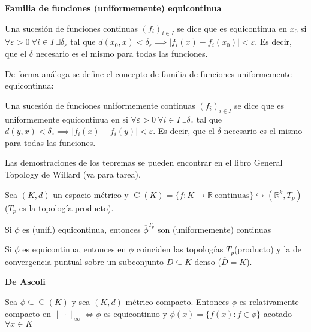 \documentclass[openany]{book}
\begin{document}
\begin{definition}
    \textbf{Familia de funciones (uniformemente) equicontinua}

    Una sucesión de funciones continuas $ (f_{i})_{i \in I} $ se dice que es equicontinua en $ x_0 $ si $ \forall  \varepsilon > 0\ \forall i \in I\  \exists \delta_{\varepsilon}$ tal que $ d(x_0,x) < \delta_{\varepsilon} \implies |f_{i}(x)-f_{i}(x_0)| < \varepsilon $. Es decir, que el $ \delta  $ necesario es el mismo para todas las funciones.
    
    De forma análoga se define el concepto de familia de funciones uniformemente equicontinua:
    
    Una sucesión de funciones uniformemente continuas $ (f_{i})_{i \in I} $ se dice que es uniformemente equicontinua en si $ \forall  \varepsilon > 0\ \forall i \in I\  \exists \delta_{\varepsilon}$ tal que $ d(y,x) < \delta_{\varepsilon} \implies |f_{i}(x)-f_{i}(y)| < \varepsilon $. Es decir, que el $ \delta  $ necesario es el mismo para todas las funciones.
\end{definition}

Las demostraciones de los teoremas se pueden encontrar en el libro General Topology de Willard (va para tarea).

\begin{theorem}
    Sea $ (K,d) $ un espacio métrico y $ \operatorname{C}(K) = \{f: K \to \mathbb{R}\ \text{continuas}\} \hookrightarrow (\mathbb{R}^{k},T_{p}) $ ($ T_{p} $ es la topología producto). 

    Si $ \phi $ es (unif.) equicontinua, entonces $ \overline{\phi}^{T_{p}}  $ son (uniformemente) continuas
\end{theorem}

\begin{theorem}
    Si $ \phi $ es equicontinua, entonces en $ \phi $ coinciden las topologías $ T_{p} $(producto) y la de convergencia puntual sobre un subconjunto $ D \subseteq K $ denso ($ \overline{D} = K $).
\end{theorem}


\begin{theorem}\textbf{De Ascoli}

    Sea $ \phi \subseteq  \operatorname{C}(K)$ y sea $ (K,d) $ métrico compacto. Entonces $ \phi $ es relativamente compacto en $ \|\cdot \|_{\infty} \iff \phi  $ es equicontinuo y $ \phi(x) = \{f(x): f \in \phi\} $ acotado $ \forall x \in K $
\end{theorem}


\end{document}
